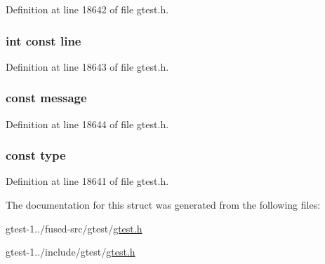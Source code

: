 \-Definition at line 18642 of file gtest.\-h.

\hypertarget{structtesting_1_1internal_1_1AssertHelper_1_1AssertHelperData_ad42b220b1bf90b42fe461c4201c064a5}{
\subsubsection[{line}]{\setlength{\rightskip}{0pt plus 5cm}int const {\bf line}}}\label{da/d69/structtesting_1_1internal_1_1AssertHelper_1_1AssertHelperData_ad42b220b1bf90b42fe461c4201c064a5}


\-Definition at line 18643 of file gtest.\-h.

\hypertarget{structtesting_1_1internal_1_1AssertHelper_1_1AssertHelperData_ad7d3cf03eb90f4520fac971afce980b6}{
\subsubsection[{message}]{ const {\bf message}}}\label{da/d69/structtesting_1_1internal_1_1AssertHelper_1_1AssertHelperData_ad7d3cf03eb90f4520fac971afce980b6}


\-Definition at line 18644 of file gtest.\-h.

\hypertarget{structtesting_1_1internal_1_1AssertHelper_1_1AssertHelperData_a411db9f4276ebb3fa7c47dd0ed5488ec}{
\subsubsection[{type}]{ const {\bf type}}}\label{da/d69/structtesting_1_1internal_1_1AssertHelper_1_1AssertHelperData_a411db9f4276ebb3fa7c47dd0ed5488ec}


\-Definition at line 18641 of file gtest.\-h.



\-The documentation for this struct was generated from the following files\-:\begin{DoxyCompactItemize}
\item 
gtest-\/1../fused-\/src/gtest/\hyperlink{fused-src_2gtest_2gtest_8h}{gtest.\-h}\item 
gtest-\/1../include/gtest/\hyperlink{include_2gtest_2gtest_8h}{gtest.\-h}\end{DoxyCompactItemize}
